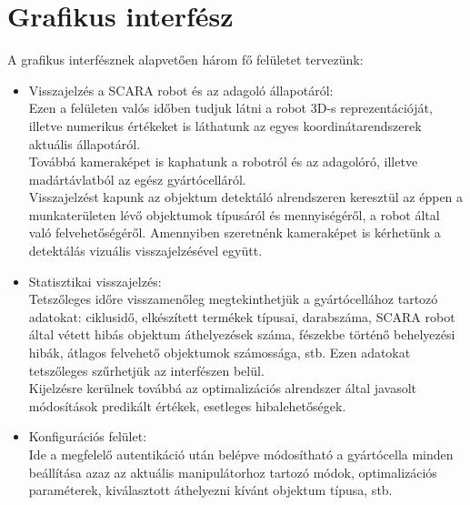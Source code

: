 \documentclass{article}
\begin{document}
\section{Grafikus interfész}
A grafikus interfésznek alapvetően három fő felületet tervezünk:
\begin{itemize}
    \item Visszajelzés a SCARA robot és az adagoló állapotáról:\vspace{5pt}\\
    Ezen a felületen valós időben tudjuk látni a robot 3D-s reprezentációját, illetve
    numerikus értékeket is láthatunk az egyes koordinátarendszerek aktuális állapotáról.\\
    Továbbá kameraképet is kaphatunk a robotról és az adagolóró, illetve madártávlatból
    az egész gyártócelláról.\\
    Visszajelzést kapunk az objektum detektáló alrendszeren keresztül az éppen a munkaterületen
    lévő objektumok típusáról és mennyiségéről, a robot által való felvehetőségéről. Amennyiben
    szeretnénk kameraképet is kérhetünk a detektálás vizuális visszajelzésével együtt.
    \item Statisztikai visszajelzés:\vspace{5pt}\\
    Tetszőleges időre visszamenőleg megtekinthetjük a gyártócellához tartozó adatokat:
    ciklusidő, elkészített termékek típusai, darabszáma, SCARA robot által vétett hibás
    objektum áthelyezések száma, fészekbe történő behelyezési hibák, átlagos felvehető objektumok
    számossága, stb. Ezen adatokat tetszőleges szűrhetjük az interfészen belül.\\
    Kijelzésre kerülnek továbbá az optimalizációs alrendszer által javasolt módosítások
    predikált értékek, esetleges hibalehetőségek.
    \item Konfigurációs felület:\vspace{5pt}\\
    Ide a megfelelő autentikáció után belépve módosítható a gyártócella minden beállítása
    azaz az aktuális manipulátorhoz tartozó módok, optimalizációs paraméterek, kiválasztott
    áthelyezni kívánt objektum típusa, stb.
\end{itemize}
\end{document}
